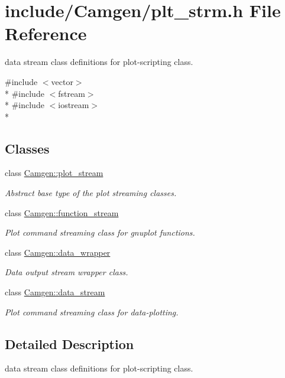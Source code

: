 \hypertarget{a00724}{}\section{include/\+Camgen/plt\+\_\+strm.h File Reference}
\label{a00724}


data stream class definitions for plot-\/scripting class.  


{\ttfamily \#include $<$vector$>$}\\*
{\ttfamily \#include $<$fstream$>$}\\*
{\ttfamily \#include $<$iostream$>$}\\*
\subsection*{Classes}
\begin{DoxyCompactItemize}
\item 
class \hyperlink{a00432}{Camgen\+::plot\+\_\+stream}
\begin{DoxyCompactList}\small\item\em Abstract base type of the plot streaming classes. \end{DoxyCompactList}\item 
class \hyperlink{a00235}{Camgen\+::function\+\_\+stream}
\begin{DoxyCompactList}\small\item\em Plot command streaming class for gnuplot functions. \end{DoxyCompactList}\item 
class \hyperlink{a00116}{Camgen\+::data\+\_\+wrapper}
\begin{DoxyCompactList}\small\item\em Data output stream wrapper class. \end{DoxyCompactList}\item 
class \hyperlink{a00115}{Camgen\+::data\+\_\+stream}
\begin{DoxyCompactList}\small\item\em Plot command streaming class for data-\/plotting. \end{DoxyCompactList}\end{DoxyCompactItemize}


\subsection{Detailed Description}
data stream class definitions for plot-\/scripting class. 

